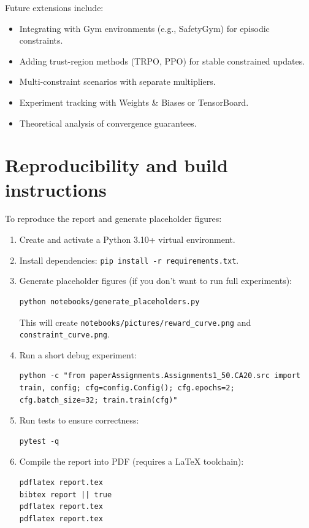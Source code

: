 Future extensions include:
\begin{itemize}
  \item Integrating with Gym environments (e.g., SafetyGym) for episodic constraints.
  \item Adding trust-region methods (TRPO, PPO) for stable constrained updates.
  \item Multi-constraint scenarios with separate multipliers.
  \item Experiment tracking with Weights \& Biases or TensorBoard.
  \item Theoretical analysis of convergence guarantees.
\end{itemize}

\section{Reproducibility and build instructions}
\label{sec:repro}
To reproduce the report and generate placeholder figures:
\begin{enumerate}
  \item Create and activate a Python 3.10+ virtual environment.
  \item Install dependencies: \texttt{pip install -r requirements.txt}.
  \item Generate placeholder figures (if you don't want to run full experiments):
  \begin{verbatim}
python notebooks/generate_placeholders.py
  \end{verbatim}
  This will create \texttt{notebooks/pictures/reward\_curve.png} and \texttt{constraint\_curve.png}.
  \item Run a short debug experiment:
  \begin{verbatim}
python -c "from paperAssignments.Assignments1_50.CA20.src import train, config; cfg=config.Config(); cfg.epochs=2; cfg.batch_size=32; train.train(cfg)"
  \end{verbatim}
  \item Run tests to ensure correctness:
  \begin{verbatim}
pytest -q
  \end{verbatim}
  \item Compile the report into PDF (requires a LaTeX toolchain):
  \begin{verbatim}
pdflatex report.tex
bibtex report || true
pdflatex report.tex
pdflatex report.tex
  \end{verbatim}
\end{enumerate}

